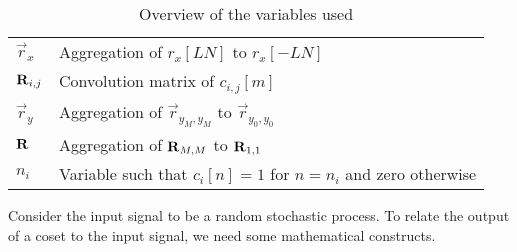 \documentclass[a4paper, openany, oneside]{memoir}
\begin{document}
\begin{table}[H]
\begin{tabularx}{\textwidth}{lY}
        $\vec{r}_x$ & Aggregation of $r_x[LN]$ to $r_x[-LN]$ \\
        $\boldsymbol{\mathbf{R}}_{i,j}$ & Convolution matrix of $c_{i,j}[m]$ \\
        $\vec{r}_y$ & Aggregation of $\vec{r}_{y_M,y_M}$ to $\vec{r}_{y_0,y_0}$ \\
        $\boldsymbol{\mathbf{R}}$ & Aggregation of $\boldsymbol{\mathbf{R}}_{M,M}$ to $\boldsymbol{\mathbf{R}}_{1,1}$ \\
        $n_i$ & Variable such that $c_i[n]=1$ for $n=n_i$ and zero otherwise
    \end{tabularx}
    \caption{Overview of the variables used}
    \label{tab:reconstruction-overview-variables}
\end{table}

Consider the input signal to be a random stochastic process. To relate the output of a coset to the input signal, we need some mathematical constructs.
\end{document}
